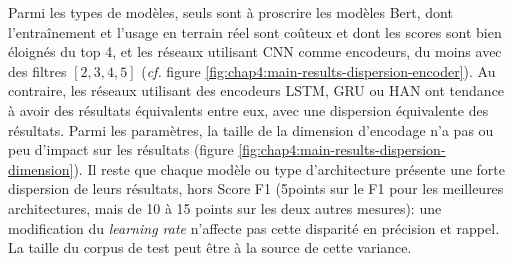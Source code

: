 Parmi les types de modèles, seuls sont à proscrire les modèles Bert, dont l'entraînement et l'usage en terrain réel sont coûteux et dont les scores sont bien éloignés du top 4, et les réseaux utilisant CNN comme encodeurs, du moins avec des filtres $[2,3,4,5]$ (\textit{cf.} figure \ref{fig:chap4:main-results-dispersion-encoder}). Au contraire, les réseaux utilisant des encodeurs LSTM, GRU ou HAN ont tendance à avoir des résultats équivalents entre eux, avec une dispersion équivalente des résultats. Parmi les paramètres, la taille de la dimension d'encodage n'a pas ou peu d'impact sur les résultats (figure \ref{fig:chap4:main-results-dispersion-dimension}). Il reste que chaque modèle ou type d'architecture présente une forte dispersion de leurs résultats, hors Score F1 (5points sur le F1 pour les meilleures architectures, mais de 10 à 15 points sur les deux autres mesures): une modification du \textit{learning rate} n'affecte pas cette disparité en précision et rappel. La taille du corpus de test peut être à la source de cette variance.

